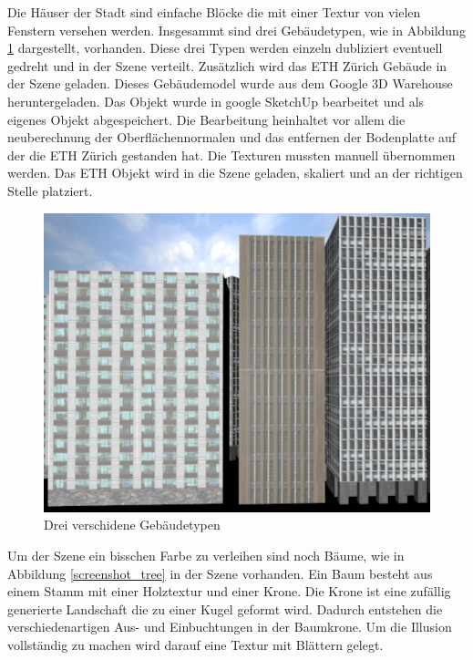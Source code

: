 Die Häuser der Stadt sind einfache Blöcke die mit einer Textur von vielen Fenstern versehen werden. Insgesammt sind drei Gebäudetypen, wie in Abbildung \ref{screenshot_buildings} dargestellt,  vorhanden. Diese drei Typen werden einzeln dubliziert eventuell gedreht und in der Szene verteilt. Zusätzlich wird das ETH Zürich Gebäude in der Szene geladen. Dieses Gebäudemodel wurde aus dem Google 3D Warehouse heruntergeladen. Das Objekt wurde in google SketchUp bearbeitet und als eigenes Objekt abgespeichert. Die Bearbeitung heinhaltet vor allem die neuberechnung der Oberflächennormalen und das entfernen der Bodenplatte auf der die ETH Zürich gestanden hat. Die Texturen mussten manuell übernommen werden. Das ETH Objekt wird in die Szene geladen, skaliert und an der richtigen Stelle platziert. 
\begin{figure}[H]
\centering 
\includegraphics[scale=0.4]{src/screenshot_buildings.png}
\caption{Drei verschidene Gebäudetypen} %
\label{screenshot_buildings} %
\end{figure}
Um der Szene ein bisschen Farbe zu verleihen sind noch Bäume, wie in Abbildung \ref{screenshot_tree} in der Szene vorhanden. Ein Baum besteht aus einem Stamm mit einer Holztextur und einer Krone. Die Krone ist eine zufällig generierte Landschaft die zu einer Kugel geformt wird. Dadurch entstehen die verschiedenartigen Aus- und Einbuchtungen in der Baumkrone. Um die Illusion vollständig zu machen wird darauf eine Textur mit Blättern gelegt.\\

